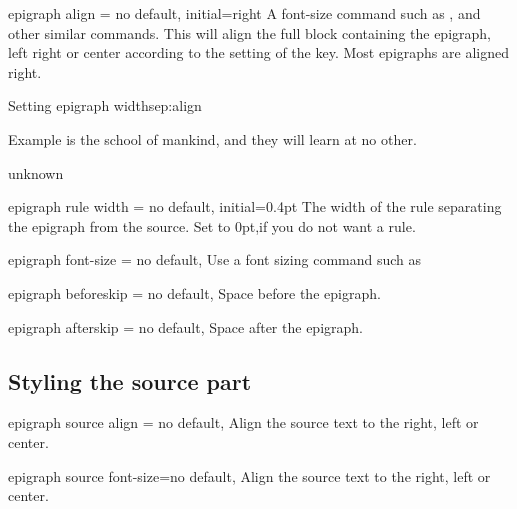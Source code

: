 \begin{docKey}[phd]{epigraph align}{ = }{no default, initial=right}
 A font-size command such as , 
 and other similar commands. This will align the full block containing the epigraph, left right or center according to the setting of the key. Most epigraphs are aligned right.
\end{docKey}

\begin{texexample}{Setting epigraph widths}{ep:align}
 \epigraph{Example is the school of mankind, and they
   will learn at no other.}{unknown}
\end{texexample}

\begin{docKey}[phd]{epigraph rule width}{ = } {no default, initial=0.4pt }
 The width of the rule separating the epigraph from the source. Set to 0pt,if you do not want a rule.
\end{docKey}



\begin{docKey}[phd]{ epigraph font-size}{ = } {no default,}
Use a font sizing command such as \cmd{\footnotesize}
\end{docKey}

\begin{docKey}[phd]{ epigraph beforeskip}{ = }{no default, }
Space before the epigraph.
\end{docKey}

\begin{docKey}[phd]{ epigraph afterskip}{ = }{no default, }
Space after the epigraph.
\end{docKey}

\subsection{Styling the source part}

\begin{docKey}[phd]{ epigraph source align =}{ }{no default, }
Align the source text to the right, left or center.
\end{docKey}

\begin{docKey}[phd]{ epigraph source}{ font-size=}{no default, }
Align the source text to the right, left or center.
\end{docKey}

